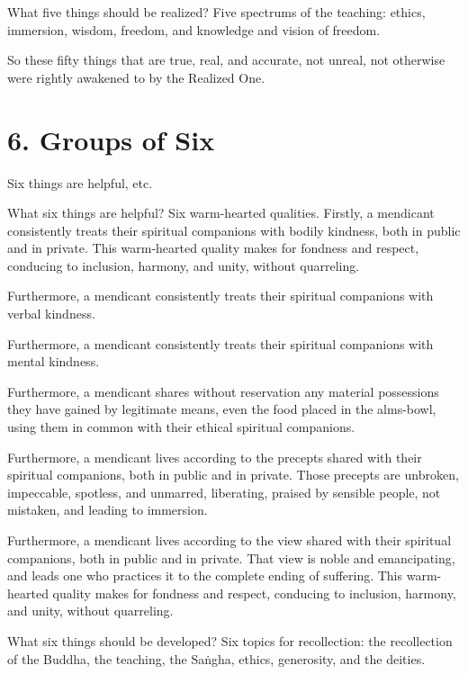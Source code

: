 \documentclass[12pt,openany]{book}%
\begin{document}
What five things should be realized? Five spectrums of the teaching: ethics, immersion, wisdom, freedom, and knowledge and vision of freedom. 

So these fifty things that are true, real, and accurate, not unreal, not otherwise were rightly awakened to by the Realized One. 

\section*{6. Groups of Six }

Six things are helpful, etc. 

What six things are helpful? Six warm-hearted qualities. Firstly, a mendicant consistently treats their spiritual companions with bodily kindness, both in public and in private. This warm-hearted quality makes for fondness and respect, conducing to inclusion, harmony, and unity, without quarreling. 

Furthermore, a mendicant consistently treats their spiritual companions with verbal kindness. 

Furthermore, a mendicant consistently treats their spiritual companions with mental kindness. 

Furthermore, a mendicant shares without reservation any material possessions they have gained by legitimate means, even the food placed in the alms-bowl, using them in common with their ethical spiritual companions. 

Furthermore, a mendicant lives according to the precepts shared with their spiritual companions, both in public and in private. Those precepts are unbroken, impeccable, spotless, and unmarred, liberating, praised by sensible people, not mistaken, and leading to immersion. 

Furthermore, a mendicant lives according to the view shared with their spiritual companions, both in public and in private. That view is noble and emancipating, and leads one who practices it to the complete ending of suffering. This warm-hearted quality makes for fondness and respect, conducing to inclusion, harmony, and unity, without quarreling. 

What six things should be developed? Six topics for recollection: the recollection of the Buddha, the teaching, the \textsanskrit{Saṅgha}, ethics, generosity, and the deities. 
\end{document}
